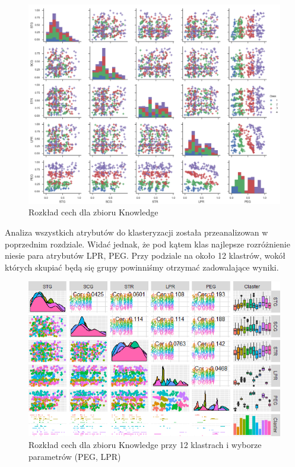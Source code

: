 \documentclass[12pt,a4paper]{article}
\begin{document}
\begin{figure}[H]
\centering
\includegraphics[width=1\textwidth]{dsKnowledgeCombined.png}
\caption{Rozkład cech dla zbioru Knowledge}
\end{figure}

Analiza wszystkich atrybutów do klasteryzacji została przeanalizowan w poprzednim rozdziale. Widać jednak, że pod kątem klas najlepsze rozróżnienie niesie para atrybutów LPR, PEG. Przy podziale na około 12 klastrów, wokół których skupiać będą się grupy powinniśmy otrzymać zadowalające wyniki.

\begin{figure}[H]
\centering
\includegraphics[width=1\textwidth]{selectedFeaturesKnowledge.PNG}
\caption{Rozkład cech dla zbioru Knowledge przy 12 klastrach i wyborze parametrów (PEG, LPR)}
\end{figure}
\end{document}
